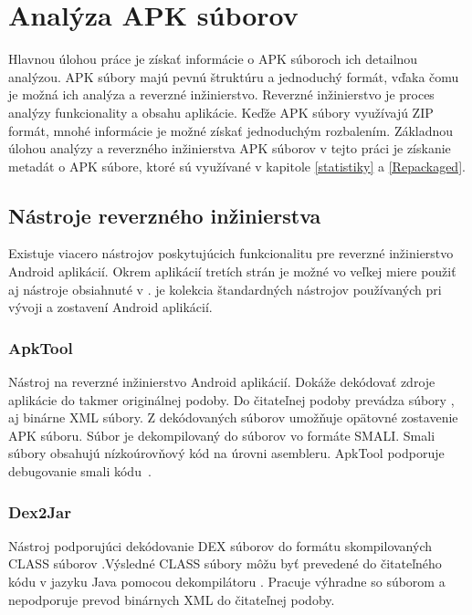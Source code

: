 \chapter{Analýza APK súborov}
\label{analyza}
Hlavnou úlohou práce je získať informácie o APK súboroch ich detailnou analýzou. APK súbory majú pevnú štruktúru a jednoduchý formát, vďaka čomu je možná ich analýza a reverzné inžinierstvo. Reverzné inžinierstvo je proces analýzy funkcionality a obsahu aplikácie. Keďže APK súbory využívajú ZIP formát, mnohé informácie je možné získať jednoduchým rozbalením. Základnou úlohou analýzy a reverzného inžinierstva APK súborov v tejto práci je získanie metadát o APK súbore, ktoré sú využívané v kapitole \ref{statistiky} a \ref{Repackaged}.

\section{Nástroje reverzného inžinierstva}
\label{nastroje_revezneho_inzinierstva}

Existuje viacero nástrojov poskytujúcich funkcionalitu pre reverzné inžinierstvo Android aplikácií. Okrem aplikácií tretích strán je možné vo veľkej miere použiť aj nástroje obsiahnuté v . je kolekcia štandardných nástrojov používaných pri vývoji a zostavení Android aplikácií. 

\subsection{ApkTool}
\label{ApkTool}
Nástroj na reverzné inžinierstvo Android aplikácií. Dokáže dekódovať zdroje aplikácie do takmer originálnej podoby. Do čitateľnej podoby prevádza súbory ,  aj binárne XML súbory. Z dekódovaných súborov umožňuje opätovné zostavenie APK súboru. Súbor  je dekompilovaný do súborov vo formáte SMALI. Smali súbory obsahujú nízkoúrovňový kód na úrovni asembleru. ApkTool podporuje debugovanie smali kódu~\cite{apkTool}.

\subsection{Dex2Jar}
\label{Dex2Jar}
Nástroj podporujúci dekódovanie DEX súborov do formátu skompilovaných CLASS súborov .Výsledné CLASS súbory môžu byť prevedené do čitateľného kódu v jazyku Java pomocou dekompilátoru . Pracuje výhradne so súborom  a nepodporuje prevod binárnych XML do čitateľnej podoby.


